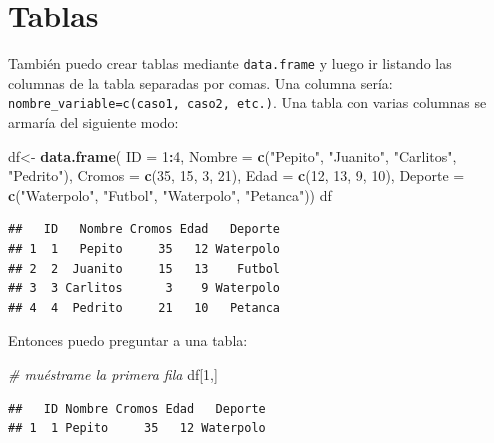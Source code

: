 \documentclass[]{book}
\newenvironment{Shaded}{\begin{snugshade}}{\end{snugshade}}
\newcommand{\CommentTok}[1]{\textcolor[rgb]{0.56,0.35,0.01}{\textit{#1}}}
\newcommand{\DataTypeTok}[1]{\textcolor[rgb]{0.13,0.29,0.53}{#1}}
\newcommand{\DecValTok}[1]{\textcolor[rgb]{0.00,0.00,0.81}{#1}}
\newcommand{\KeywordTok}[1]{\textcolor[rgb]{0.13,0.29,0.53}{\textbf{#1}}}
\newcommand{\NormalTok}[1]{#1}
\newcommand{\OperatorTok}[1]{\textcolor[rgb]{0.81,0.36,0.00}{\textbf{#1}}}
\newcommand{\StringTok}[1]{\textcolor[rgb]{0.31,0.60,0.02}{#1}}
\theoremstyle{definition}
\theoremstyle{definition}
\theoremstyle{definition}
\theoremstyle{remark}
\begin{document}
\hypertarget{tablas}{%
\section{Tablas}\label{tablas}}

También puedo crear tablas mediante \texttt{data.frame} y luego ir
listando las columnas de la tabla separadas por comas. Una columna
sería: \texttt{nombre\_variable=c(caso1,\ caso2,\ etc.)}. Una tabla con
varias columnas se armaría del siguiente modo:

\begin{Shaded}
\begin{Highlighting}[]
\NormalTok{df<-}\StringTok{ }\KeywordTok{data.frame}\NormalTok{( }\DataTypeTok{ID =} \DecValTok{1}\OperatorTok{:}\DecValTok{4}\NormalTok{,}
     \DataTypeTok{Nombre =} \KeywordTok{c}\NormalTok{(}\StringTok{"Pepito"}\NormalTok{, }\StringTok{"Juanito"}\NormalTok{, }\StringTok{"Carlitos"}\NormalTok{, }\StringTok{"Pedrito"}\NormalTok{),}
     \DataTypeTok{Cromos =} \KeywordTok{c}\NormalTok{(}\DecValTok{35}\NormalTok{, }\DecValTok{15}\NormalTok{, }\DecValTok{3}\NormalTok{, }\DecValTok{21}\NormalTok{), }
     \DataTypeTok{Edad =} \KeywordTok{c}\NormalTok{(}\DecValTok{12}\NormalTok{, }\DecValTok{13}\NormalTok{, }\DecValTok{9}\NormalTok{, }\DecValTok{10}\NormalTok{),}
     \DataTypeTok{Deporte =} \KeywordTok{c}\NormalTok{(}\StringTok{"Waterpolo"}\NormalTok{, }\StringTok{"Futbol"}\NormalTok{, }\StringTok{"Waterpolo"}\NormalTok{, }\StringTok{"Petanca"}\NormalTok{))     }
\NormalTok{df}
\end{Highlighting}
\end{Shaded}

\begin{verbatim}
##   ID   Nombre Cromos Edad   Deporte
## 1  1   Pepito     35   12 Waterpolo
## 2  2  Juanito     15   13    Futbol
## 3  3 Carlitos      3    9 Waterpolo
## 4  4  Pedrito     21   10   Petanca
\end{verbatim}

Entonces puedo preguntar a una tabla:

\begin{Shaded}
\begin{Highlighting}[]
\CommentTok{# muéstrame la primera fila}
\NormalTok{df[}\DecValTok{1}\NormalTok{,] }
\end{Highlighting}
\end{Shaded}

\begin{verbatim}
##   ID Nombre Cromos Edad   Deporte
## 1  1 Pepito     35   12 Waterpolo
\end{verbatim}
\end{document}
